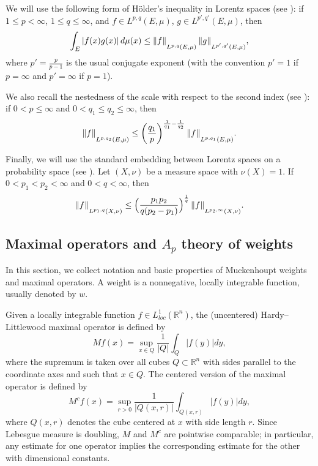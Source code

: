 \documentclass[reqno, 10pt, oneside]{amsart}
\numberwithin{equation}{section}
\newcommand{\strt}[1]{\rule{0pt}{#1}}
\numberwithin{theorem}{section}
\newcommand{\R}{{\mathbb R}}
\newcommand{\1}{{\rm 1\hspace*{-0.4ex}%
\rule{0.1ex}{1.52ex}\hspace*{0.2ex}}}
\begin{document}
We will use the following form of H\"older's inequality in Lorentz spaces (see \cite{KS10}): if $1\le p<\infty$, $1\le q\le\infty$, and $f\in L^{p,q}(E,\mu)$, $g\in L^{p',q'}(E,\mu)$, then
\begin{equation}\label{Holder Lorentz}
	\int_{E} |f(x)g(x)|\,d\mu(x)
	\le \|f\|_{\strt{2.3ex} L^{p,q}(E,\mu)}\,\|g\|_{ \strt{2.3ex} L^{p',q'}(E,\mu)},
\end{equation}
where $p'=\frac{p}{p-1}$ is the usual conjugate exponent (with the convention $p'=1$ if $p=\infty$ and $p'=\infty$ if $p=1$).

We also recall the nestedness of the scale with respect to the second index (see \cite{BS}): if $0<p\le\infty$ and $0<q_1\le q_2\le\infty$, then
\begin{equation}\label{eq:lorentz-nestedness}
	\|f\|_{\strt{2.3ex} L^{p,q_2}(E,\mu)} \le \left(\frac{q_1}{p}\right)^{\frac{1}{q_1}-\frac{1}{q_2}}
\|f\|_{\strt{2.3ex} L^{p,q_1}(E,\mu)}.
\end{equation}


Finally, we will use the standard embedding between Lorentz spaces on a probability space (see \cite{Hunt}). Let $(X,\nu)$ be a measure space with $\nu(X)=1$. If $0<p_1<p_2<\infty$ and $0<q<\infty$,
then
\begin{equation}\label{Lorentz inclusion}
	\|f\|_{\strt{2.3ex} L^{p_1,q}(X,\nu)}
	\le \Big(\frac{p_1p_2}{q(p_2-p_1)}\Big)^{\frac{1}{q}}\,\|f\|_{\strt{2.3ex} L^{p_2,\infty}(X,\nu)}.
\end{equation}




\subsection{Maximal operators and \texorpdfstring{$A_p$}{Ap} theory of weights}

In this section, we collect notation and basic properties of Muckenhoupt weights and maximal operators. A weight is a nonnegative, locally integrable function, usually denoted by $w$. 


Given a locally integrable function $f\in L^1_{loc}(\R^n)$, the (uncentered) Hardy--Littlewood maximal operator is defined by
	\begin{equation*}
			M f(x) = \sup_{x\in Q}  \frac{1}{|Q|}\int_Q |f(y)|dy,
	\end{equation*}
		where the supremum is taken over all cubes $Q\subset \R^n$ with sides parallel to the coordinate axes and such that $x\in Q$. The centered version of the maximal operator is defined by
\begin{equation*}
	M^c f(x) = \sup_{r>0} \frac{1}{|Q(x,r)|} \int_{Q(x,r)}|f(y)|dy,
\end{equation*}
where $Q(x,r)$ denotes the cube centered at $x$ with side length $r$. Since Lebesgue measure is doubling, $M$ and $M^c$ are pointwise comparable; in particular, any estimate for one operator implies the corresponding estimate for the other with dimensional constants.
\end{document}
